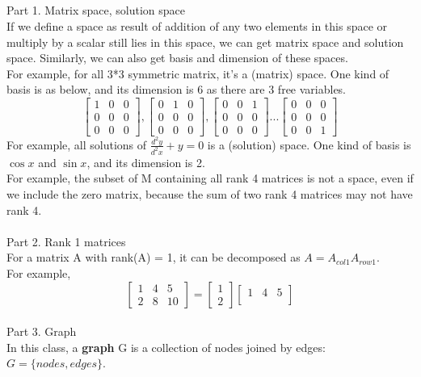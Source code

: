 \documentclass{article}
\begin{document}
\begin{spacing}{1.5}
\section{}
Part 1. Matrix space, solution space\\
If we define a space as result of addition of any two elements in this space or multiply by a scalar still lies in this space, we can get matrix space and solution space. Similarly, we can also get basis and dimension of these spaces. \\
For example, for all 3*3 symmetric matrix, it's a (matrix) space. One kind of basis is as below, and its dimension is 6 as there are 3 free variables.
$$
\begin{bmatrix}
	1 & 0 & 0 \\
	0 & 0 & 0 \\ 
	0 & 0 & 0
\end{bmatrix}
,
\begin{bmatrix}
	0 & 1 & 0 \\
	0 & 0 & 0 \\ 
	0 & 0 & 0
\end{bmatrix}
,
\begin{bmatrix}
	0 & 0 & 1 \\
	0 & 0 & 0 \\ 
	0 & 0 & 0
\end{bmatrix}
...
\begin{bmatrix}
	0 & 0 & 0 \\
	0 & 0 & 0 \\ 
	0 & 0 & 1
\end{bmatrix}
$$
For example, all solutions of $\frac{d^2y}{d^2x}+y=0$ is a (solution) space. One kind of basis is $\cos x$ and $\sin x$, and its dimension is 2.\\
For example, the subset of M containing all rank 4 matrices is not a space, even if we include the zero matrix, because the sum of two rank 4 matrices may not have rank 4.\\
\\ Part 2. Rank 1 matrices \\
For a matrix A with rank(A) = 1, it can be decomposed as $A = A_{col1} A_{row1}$.\\
For example,
$$
\begin{bmatrix}
1 & 4 & 5 \\
2 & 8 & 10
\end{bmatrix}
= 
\begin{bmatrix}
1 \\
2 
\end{bmatrix}
\begin{bmatrix}
1 & 4 & 5\\
\end{bmatrix}
$$
\\Part 3. Graph \\
In this class, a {\bfseries graph} G is a collection of nodes joined by edges: 
$G = \{nodes, edges\}$. 




\end{spacing}
\end{document}
